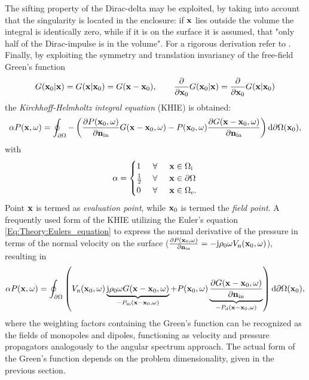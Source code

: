 The sifting property of the Dirac-delta may be exploited, by taking into account that the singularity is located in the enclosure:
if $\mathbf{x}$ lies outside the volume the integral is identically zero, while if it is on the surface it is assumed, that "only half of the Dirac-impulse is in the volume". For a rigorous derivation refer to \cite{Williams1999}.
Finally, by exploiting the symmetry and translation invariancy of the free-field Green's function
\begin{equation}
G(\mathbf{x}_0|\mathbf{x}) = G(\mathbf{x}|\mathbf{x}_0) = G(\mathbf{x}-\mathbf{x}_0), \qquad
\frac{\partial}{\partial \mathbf{x}_0} G(\mathbf{x}_0|\mathbf{x})= \frac{\partial}{\partial \mathbf{x}_0} G(\mathbf{x}|\mathbf{x}_0)
\end{equation}
the \emph{Kirchhoff-Helmholtz integral equation} (KHIE) is obtained:
\begin{equation}
\alpha P(\mathbf{x},\omega) = 
\oint_{\partial \Omega} - \left( 
\frac{\partial P(\mathbf{x}_0,\omega)}{\partial \mathbf{n}_{\mathrm{in}}} G(\mathbf{x}-\mathbf{x}_0,\omega)
-
P(\mathbf{x}_0,\omega)  \frac{\partial G(\mathbf{x}-\mathbf{x}_0,\omega)}{\partial\mathbf{n}_{\mathrm{in}}} 
\right)   \mathrm{d} \partial \Omega( \mathbf{x}_0),
\label{Eq:Theory:Kirchhoff-Helmholtz}
\end{equation}
with
\begin{equation*}
\alpha = \begin{cases} 
1           & \hspace{1mm} \forall \hspace{5mm}  \mathbf{x} \in \Omega_{\mathrm{i}}  	   \\
\frac{1}{2} & \hspace{1mm} \forall \hspace{5mm}  \mathbf{x} \in \partial \Omega  \\
0 			& \hspace{1mm} \forall \hspace{5mm}  \mathbf{x} \in \Omega_{\mathrm{e}}.
\end{cases}
\end{equation*}
Point $\mathbf{x}$ is termed as \emph{evaluation point}, while $\mathbf{x}_0$ is termed the \emph{field point}. 
A frequently used form of the KHIE utilizing the Euler's equation \eqref{Eq:Theory:Eulers_equation} to express the normal derivative of the pressure in terms of the normal velocity on the surface ($\frac{\partial P(\mathbf{x}_0,\omega)}{\partial \mathbf{n}_{\mathrm{in}}} = -\mathrm{j} \rho_0 \omega V_{\mathrm{n}}(\mathbf{x}_0,\omega)$), resulting in
\begin{equation}
\alpha P(\mathbf{x},\omega) = 
\oint_{\partial \Omega}  \left(  
V_{\mathrm{n}}(\mathbf{x}_0,\omega) \underbrace{\mathrm{j} \rho_0 \omega  G(\mathbf{x}-\mathbf{x}_0,\omega) }_{-P_{\mathrm{m}}(\mathbf{x}-\mathbf{x}_0,\omega)}
+
P(\mathbf{x}_0,\omega)  \underbrace{\frac{\partial G(\mathbf{x}-\mathbf{x}_0,\omega)}{\partial \mathbf{n}_{\mathrm{in}}}}_{-P_{\mathrm{d}}(\mathbf{x}-\mathbf{x}_0,\omega)}
\right)   \mathrm{d} \partial \Omega(\mathbf{x}_0),
\label{Eq:Theory:Kirchhoff}
\end{equation}
where the weighting factors containing the Green's function can be recognized as the fields of monopoles and dipoles, functioning as velocity and pressure propagators analogously to the angular spectrum approach.
The actual form of the Green's function depends on the problem dimensionality, given in the previous section.

